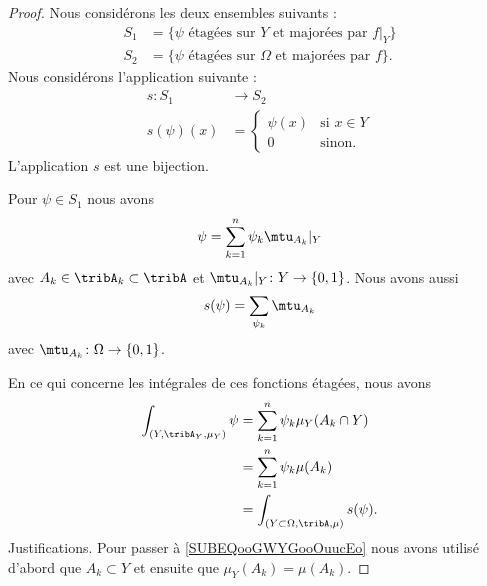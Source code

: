 \begin{proof}
    Nous considérons les deux ensembles suivants :
    \begin{subequations}
        \begin{align}
            S_1&=\{ \psi\text{ étagées sur } Y\text{ et majorées par } f|_Y \}\\
            S_2&=\{ \psi\text{ étagées sur } \Omega\text{ et majorées par } f \}.
        \end{align}
    \end{subequations}
    Nous considérons l'application suivante :
    \begin{equation}
        \begin{aligned}
            s\colon S_1&\to S_2 \\
            s(\psi)(x)&=\begin{cases}
                \psi(x)    &   \text{si } x\in Y\\
                0    &    \text{sinon.}
            \end{cases}
        \end{aligned}
    \end{equation}
    L'application \( s\) est une bijection.

    Pour \( \psi\in S_1\) nous avons 
    \begin{equation}
        \psi=\sum_{k=1}^n\psi_k\mtu_{A_k}|_Y
    \end{equation}
    avec \( A_k\in \tribA_k\subset \tribA\) et \( \mtu_{A_k}|_Y\colon Y\to \{ 0,1 \}\). Nous avons aussi
    \begin{equation}
        s(\psi)=\sum_{\psi_k}\mtu_{A_k}
    \end{equation}
    avec \( \mtu_{A_k}\colon \Omega\to \{ 0,1 \}\).

    En ce qui concerne les intégrales de ces fonctions étagées, nous avons
    \begin{subequations}
        \begin{align}
            \int_{(Y,\tribA_Y,\mu_Y)}\psi&=\sum_{k=1}^n\psi_k\mu_Y(A_k\cap Y)\\
            &=\sum_{k=1}^n\psi_k\mu(A_k) \label{SUBEQooGWYGooOuucEo}\\
            &=\int_{(Y\subset \Omega,\tribA,\mu)}s(\psi).
        \end{align}
    \end{subequations}
    Justifications. Pour passer à \eqref{SUBEQooGWYGooOuucEo} nous avons utilisé d'abord que \( A_k\subset Y\) et ensuite que \( \mu_Y(A_k)=\mu(A_k)\).


\end{proof}
